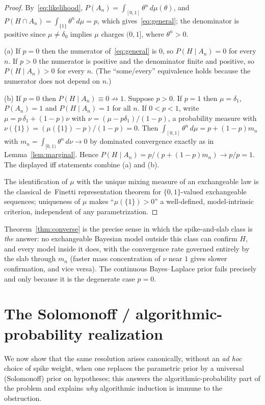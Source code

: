 \documentclass{amsart}
\theoremstyle{definition}
\begin{document}
\begin{proof}
By~\eqref{eq:likelihood}, $P(A_n)=\int_{[0,1]}\theta^n\,d\mu(\theta)$, and
$P(H\cap A_n)=\int_{\{1\}}\theta^n\,d\mu=p$, which gives~\eqref{eq:general}; the
denominator is positive since $\mu\ne\delta_0$ implies $\mu$ charges $(0,1]$,
where $\theta^n>0$.

(a) If $p=0$ then the numerator of~\eqref{eq:general} is $0$, so
$P(H\mid A_n)=0$ for every $n$. If $p>0$ the numerator is positive and the
denominator finite and positive, so $P(H\mid A_n)>0$ for every $n$. (The
``some/every'' equivalence holds because the numerator does not depend on $n$.)

(b) If $p=0$ then $P(H\mid A_n)\equiv0\not\to1$. Suppose $p>0$. If $p=1$ then
$\mu=\delta_1$, $P(A_n)=1$ and $P(H\mid A_n)=1$ for all $n$. If $0<p<1$, write
$\mu=p\,\delta_1+(1-p)\nu$ with $\nu=(\mu-p\delta_1)/(1-p)$, a probability
measure with $\nu(\{1\})=(\mu(\{1\})-p)/(1-p)=0$. Then
$\int_{[0,1]}\theta^n\,d\mu=p+(1-p)m_n$ with $m_n=\int_{[0,1)}\theta^n\,d\nu\to0$
by dominated convergence exactly as in Lemma~\ref{lem:marginal}. Hence
$P(H\mid A_n)=p/(p+(1-p)m_n)\to p/p=1$. The displayed iff statements combine (a)
and (b).

The identification of $\mu$ with the unique mixing measure of an exchangeable law
is the classical de~Finetti representation theorem for $\{0,1\}$-valued
exchangeable sequences; uniqueness of $\mu$ makes ``$\mu(\{1\})>0$'' a
well-defined, model-intrinsic criterion, independent of any parametrization.
\end{proof}

Theorem~\ref{thm:converse} is the precise sense in which the spike-and-slab
class is \emph{the} answer: no exchangeable Bayesian model outside this class can
confirm $H$, and every model inside it does, with the convergence rate governed
entirely by the slab through $m_n$ (faster mass concentration of $\nu$ near $1$
gives slower confirmation, and vice versa). The continuous Bayes--Laplace prior
fails precisely and only because it is the degenerate case $p=0$.

\section{The Solomonoff / algorithmic-probability realization}\label{sec:solomonoff}

We now show that the same resolution arises canonically, without an \emph{ad hoc}
choice of spike weight, when one replaces the parametric prior by a universal
(Solomonoff) prior on hypotheses; this answers the algorithmic-probability part
of the problem and explains \emph{why} algorithmic induction is immune to the
obstruction.
\end{document}
